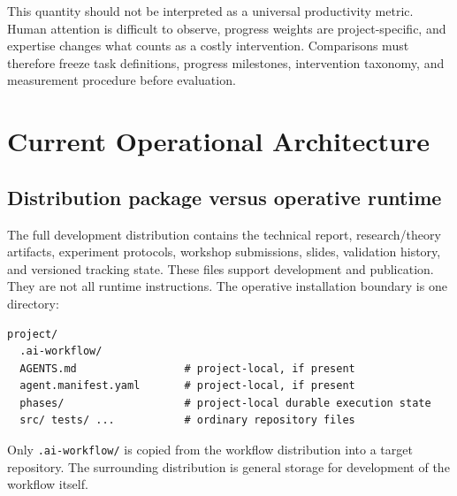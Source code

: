 \documentclass[11pt,a4paper]{article}
\begin{document}
This quantity should not be interpreted as a universal productivity metric. Human attention is difficult to observe, progress weights are project-specific, and expertise changes what counts as a costly intervention. Comparisons must therefore freeze task definitions, progress milestones, intervention taxonomy, and measurement procedure before evaluation.


\section{Current Operational Architecture}\label{sec:current-architecture}

\subsection{Distribution package versus operative runtime}
The full development distribution contains the technical report, research/theory artifacts, experiment protocols, workshop submissions, slides, validation history, and versioned tracking state. These files support development and publication. They are not all runtime instructions. The operative installation boundary is one directory:
\begin{lstlisting}[style=workflow]
project/
  .ai-workflow/
  AGENTS.md                 # project-local, if present
  agent.manifest.yaml       # project-local, if present
  phases/                   # project-local durable execution state
  src/ tests/ ...           # ordinary repository files
\end{lstlisting}
Only \texttt{.ai-workflow/} is copied from the workflow distribution into a target repository. The surrounding distribution is general storage for development of the workflow itself.
\end{document}
